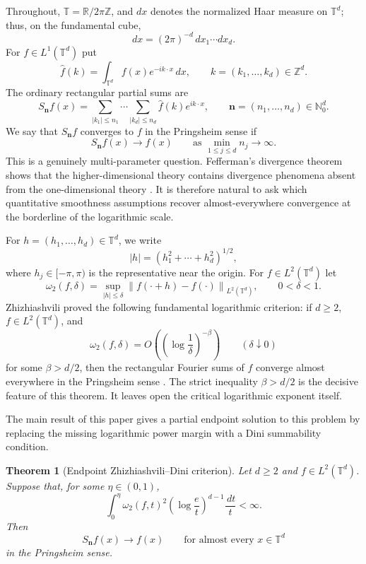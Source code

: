 \documentclass[11pt,reqno]{amsart}
\numberwithin{equation}{section}
\theoremstyle{plain}
\newtheorem{theorem}{Theorem}[section]
\theoremstyle{definition}
\theoremstyle{remark}
\newcommand{\T}{\mathbb T}
\newcommand{\Z}{\mathbb Z}
\newcommand{\dd}{\,d}
\newcommand{\wh}{\widehat}
\newcommand{\norm}[1]{\left\lVert #1\right\rVert}
\newcommand{\abs}[1]{\left\lvert #1\right\rvert}
\begin{document}
Throughout, $\T=\mathbb R/2\pi\mathbb Z$, and $dx$ denotes the normalized Haar measure on $\T^d$; thus, on the fundamental cube,
\[
 dx=(2\pi)^{-d}\,dx_1\cdots dx_d .
\]
For $f\in L^1(\T^d)$ put
\[
 \wh f(k)=\int_{\T^d} f(x)e^{-ik\cdot x}\dd x,
 \qquad k=(k_1,\ldots,k_d)\in\Z^d.
\]
The ordinary rectangular partial sums are
\begin{equation}\label{eq:rectangular-sums}
 S_{\mathbf n}f(x)=
 \sum_{\abs{k_1}\le n_1}\cdots\sum_{\abs{k_d}\le n_d}\wh f(k)e^{ik\cdot x},
 \qquad \mathbf n=(n_1,\ldots,n_d)\in\mathbb N_0^d.
\end{equation}
We say that $S_{\mathbf n}f$ converges to $f$ in the Pringsheim sense if
\[
 S_{\mathbf n}f(x)\longrightarrow f(x)
 \qquad\text{as }\min_{1\le j\le d}n_j\to\infty .
\]
This is a genuinely multi-parameter question. Fefferman's divergence theorem shows that the higher-dimensional theory contains divergence phenomena absent from the one-dimensional theory \cite{Fefferman1971}. It is therefore natural to ask which quantitative smoothness assumptions recover almost-everywhere convergence at the borderline of the logarithmic scale.

For $h=(h_1,\ldots,h_d)\in\T^d$, we write
\[
 \abs{h}=(h_1^2+\cdots+h_d^2)^{1/2},
\]
where $h_j\in[-\pi,\pi)$ is the representative near the origin. For $f\in L^2(\T^d)$ let
\begin{equation}\label{eq:modulus}
 \omega_2(f,\delta)=\sup_{\abs{h}\le\delta}\norm{f(\cdot+h)-f(\cdot)}_{L^2(\T^d)},
 \qquad 0<\delta<1 .
\end{equation}
Zhizhiashvili proved the following fundamental logarithmic criterion: if $d\ge2$, $f\in L^2(\T^d)$, and
\begin{equation}\label{eq:zhizhiashvili-classical}
 \omega_2(f,\delta)=O\left(\left(\log \frac1\delta\right)^{-\beta}\right)
 \qquad(\delta\downarrow0)
\end{equation}
for some $\beta>d/2$, then the rectangular Fourier sums of $f$ converge almost everywhere in the Pringsheim sense \cite{Zhizhiashvili1996}. The strict inequality $\beta>d/2$ is the decisive feature of this theorem. It leaves open the critical logarithmic exponent itself.

The main result of this paper gives a partial endpoint solution to this problem by replacing the missing logarithmic power margin with a Dini summability condition.

\begin{theorem}[Endpoint Zhizhiashvili--Dini criterion]\label{thm:main}
Let $d\ge2$ and $f\in L^2(\T^d)$. Suppose that, for some $\eta\in(0,1)$,
\begin{equation}\label{eq:main-dini}
 \int_0^\eta \omega_2(f,t)^2\left(\log\frac et\right)^{d-1}\frac{\dd t}{t}<\infty .
\end{equation}
Then
\[
 S_{\mathbf n}f(x)\longrightarrow f(x)
 \qquad\text{for almost every }x\in\T^d
\]
in the Pringsheim sense.
\end{theorem}
\end{document}
